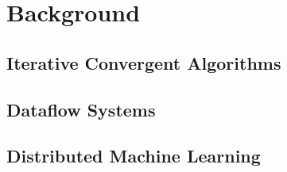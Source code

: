 \chapter{Background}

\section{Iterative Convergent Algorithms}

\section{Dataflow Systems}

\section{Distributed Machine Learning}

